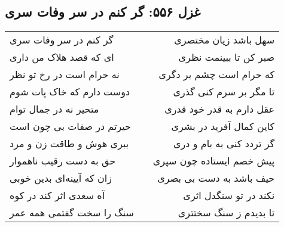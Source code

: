 \begin{center}
\section*{غزل ۵۵۶: گر کنم در سر وفات سری}
\label{sec:556}
\begin{longtable}{l p{0.5cm} r}
گر کنم در سر وفات سری
&&
سهل باشد زیان مختصری
\\
ای که قصد هلاک من داری
&&
صبر کن تا ببینمت نظری
\\
نه حرام است در رخ تو نظر
&&
که حرام است چشم بر دگری
\\
دوست دارم که خاک پات شوم
&&
تا مگر بر سرم کنی گذری
\\
متحیر نه در جمال توام
&&
عقل دارم به قدر خود قدری
\\
حیرتم در صفات بی چون است
&&
کاین کمال آفرید در بشری
\\
ببری هوش و طاقت زن و مرد
&&
گر تردد کنی به بام و دری
\\
حق به دست رقیب ناهموار
&&
پیش خصم ایستاده چون سپری
\\
زان که آیینه‌ای بدین خوبی
&&
حیف باشد به دست بی بصری
\\
آه سعدی اثر کند در کوه
&&
نکند در تو سنگدل اثری
\\
سنگ را سخت گفتمی همه عمر
&&
تا بدیدم ز سنگ سختتری
\\
\end{longtable}
\end{center}
